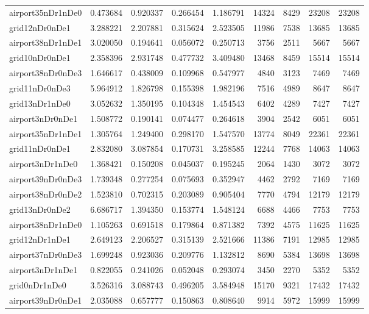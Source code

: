 \begin{longtable}{|l|r|r|r|r|r|r|r|r|}
airport35nDr1nDe0 & 0.473684 & 0.920337 & 0.266454 & 1.186791 & 14324 & 8429 & 23208 & 23208 \\
grid12nDr0nDe1 & 3.288221 & 2.207881 & 0.315624 & 2.523505 & 11986 & 7538 & 13685 & 13685 \\
airport38nDr1nDe1 & 3.020050 & 0.194641 & 0.056072 & 0.250713 & 3756 & 2511 & 5667 & 5667 \\
grid10nDr0nDe1 & 2.358396 & 2.931748 & 0.477732 & 3.409480 & 13468 & 8459 & 15514 & 15514 \\
airport38nDr0nDe3 & 1.646617 & 0.438009 & 0.109968 & 0.547977 & 4840 & 3123 & 7469 & 7469 \\
grid11nDr0nDe3 & 5.964912 & 1.826798 & 0.155398 & 1.982196 & 7516 & 4989 & 8647 & 8647 \\
grid13nDr1nDe0 & 3.052632 & 1.350195 & 0.104348 & 1.454543 & 6402 & 4289 & 7427 & 7427 \\
airport3nDr0nDe1 & 1.508772 & 0.190141 & 0.074477 & 0.264618 & 3904 & 2542 & 6051 & 6051 \\
airport35nDr1nDe1 & 1.305764 & 1.249400 & 0.298170 & 1.547570 & 13774 & 8049 & 22361 & 22361 \\
grid11nDr0nDe1 & 2.832080 & 3.087854 & 0.170731 & 3.258585 & 12244 & 7768 & 14063 & 14063 \\
airport3nDr1nDe0 & 1.368421 & 0.150208 & 0.045037 & 0.195245 & 2064 & 1430 & 3072 & 3072 \\
airport39nDr0nDe3 & 1.739348 & 0.277254 & 0.075693 & 0.352947 & 4462 & 2792 & 7169 & 7169 \\
airport38nDr0nDe2 & 1.523810 & 0.702315 & 0.203089 & 0.905404 & 7770 & 4794 & 12179 & 12179 \\
grid13nDr0nDe2 & 6.686717 & 1.394350 & 0.153774 & 1.548124 & 6688 & 4466 & 7753 & 7753 \\
airport38nDr1nDe0 & 1.105263 & 0.691518 & 0.179864 & 0.871382 & 7392 & 4575 & 11625 & 11625 \\
grid12nDr1nDe1 & 2.649123 & 2.206527 & 0.315139 & 2.521666 & 11386 & 7191 & 12985 & 12985 \\
airport37nDr0nDe3 & 1.699248 & 0.923036 & 0.209776 & 1.132812 & 8690 & 5384 & 13698 & 13698 \\
airport3nDr1nDe1 & 0.822055 & 0.241026 & 0.052048 & 0.293074 & 3450 & 2270 & 5352 & 5352 \\
grid0nDr1nDe0 & 3.526316 & 3.088743 & 0.496205 & 3.584948 & 15170 & 9321 & 17432 & 17432 \\
airport39nDr0nDe1 & 2.035088 & 0.657777 & 0.150863 & 0.808640 & 9914 & 5972 & 15999 & 15999 \\

\end{longtable}
